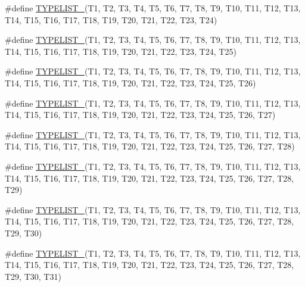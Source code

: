 \begin{DoxyCompactItemize}
\item 
\#define \mbox{\hyperlink{adat-devel_2lib_2adat_2typelist_8h_a780ffd0189e54147b52c8c183eeb67d8}{T\+Y\+P\+E\+L\+I\+S\+T\+\_}}(T1,  T2,  T3,  T4,  T5,  T6,  T7,  T8,  T9,  T10,  T11,  T12,  T13,  T14,  T15,  T16,  T17,  T18,  T19,  T20,  T21,  T22,  T23,  T24)
\item 
\#define \mbox{\hyperlink{adat-devel_2lib_2adat_2typelist_8h_a4b7a75dd0f09d972340f25018c4b8ba1}{T\+Y\+P\+E\+L\+I\+S\+T\+\_}}(T1,  T2,  T3,  T4,  T5,  T6,  T7,  T8,  T9,  T10,  T11,  T12,  T13,  T14,  T15,  T16,  T17,  T18,  T19,  T20,  T21,  T22,  T23,  T24,  T25)
\item 
\#define \mbox{\hyperlink{adat-devel_2lib_2adat_2typelist_8h_a5afc04d2ac7b4bdb0d494386d703b118}{T\+Y\+P\+E\+L\+I\+S\+T\+\_}}(T1,  T2,  T3,  T4,  T5,  T6,  T7,  T8,  T9,  T10,  T11,  T12,  T13,  T14,  T15,  T16,  T17,  T18,  T19,  T20,  T21,  T22,  T23,  T24,  T25,  T26)
\item 
\#define \mbox{\hyperlink{adat-devel_2lib_2adat_2typelist_8h_aea987351370823a56609c855fbdd3a38}{T\+Y\+P\+E\+L\+I\+S\+T\+\_}}(T1,  T2,  T3,  T4,  T5,  T6,  T7,  T8,  T9,  T10,  T11,  T12,  T13,  T14,  T15,  T16,  T17,  T18,  T19,  T20,  T21,  T22,  T23,  T24,  T25,  T26,  T27)
\item 
\#define \mbox{\hyperlink{adat-devel_2lib_2adat_2typelist_8h_a81cca6a83ebd8411dd68b01bbbc7a802}{T\+Y\+P\+E\+L\+I\+S\+T\+\_}}(T1,  T2,  T3,  T4,  T5,  T6,  T7,  T8,  T9,  T10,  T11,  T12,  T13,  T14,  T15,  T16,  T17,  T18,  T19,  T20,  T21,  T22,  T23,  T24,  T25,  T26,  T27,  T28)
\item 
\#define \mbox{\hyperlink{adat-devel_2lib_2adat_2typelist_8h_a6769b0da98971be2a4dc91702d2b4630}{T\+Y\+P\+E\+L\+I\+S\+T\+\_}}(T1,  T2,  T3,  T4,  T5,  T6,  T7,  T8,  T9,  T10,  T11,  T12,  T13,  T14,  T15,  T16,  T17,  T18,  T19,  T20,  T21,  T22,  T23,  T24,  T25,  T26,  T27,  T28,  T29)
\item 
\#define \mbox{\hyperlink{adat-devel_2lib_2adat_2typelist_8h_ad4ac4fef94ea5753af44b5672c9117e6}{T\+Y\+P\+E\+L\+I\+S\+T\+\_}}(T1,  T2,  T3,  T4,  T5,  T6,  T7,  T8,  T9,  T10,  T11,  T12,  T13,  T14,  T15,  T16,  T17,  T18,  T19,  T20,  T21,  T22,  T23,  T24,  T25,  T26,  T27,  T28,  T29,  T30)
\item 
\#define \mbox{\hyperlink{adat-devel_2lib_2adat_2typelist_8h_aef8c0fa7e8bd3a11a7575fc40a088e34}{T\+Y\+P\+E\+L\+I\+S\+T\+\_}}(T1,  T2,  T3,  T4,  T5,  T6,  T7,  T8,  T9,  T10,  T11,  T12,  T13,  T14,  T15,  T16,  T17,  T18,  T19,  T20,  T21,  T22,  T23,  T24,  T25,  T26,  T27,  T28,  T29,  T30,  T31)

\end{DoxyCompactItemize}

